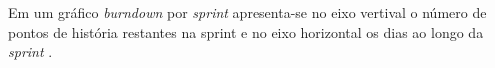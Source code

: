     Em um gráfico \textit{burndown} por \textit{sprint} apresenta-se no eixo vertival o número de pontos de história restantes na sprint e no eixo horizontal os dias ao longo da \textit{sprint} \cite{cohn06}.





